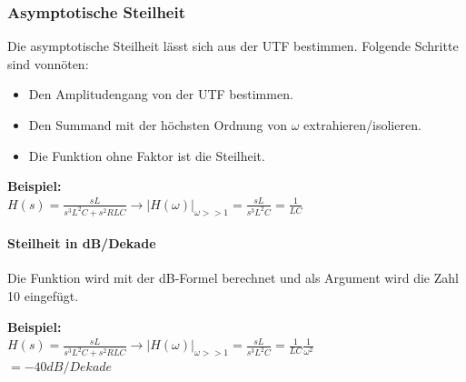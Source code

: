 		\subsubsection{Asymptotische Steilheit}
			\parbox{9cm}{
			Die asymptotische Steilheit lässt sich aus der UTF bestimmen. 
			Folgende Schritte sind vonnöten:
			\begin{itemize}
				\item Den Amplitudengang von der UTF bestimmen.
				\item Den Summand mit der höchsten Ordnung von $\omega$ extrahieren/isolieren.
				\item Die Funktion ohne Faktor ist die Steilheit.
			\end{itemize}
			}
			\parbox{1cm}{
				\quad
			}
			\parbox{9cm}{
				\textbf{Beispiel:} \\
				$H(s) = \frac{sL}{s^3L^2C + s^2RLC} \rightarrow |H(\omega)|_{\omega >> 1} = \frac{sL}{s^3L^2C} = \frac{1}{LC}$
			}
		
			\paragraph{Steilheit in dB/Dekade}
				\parbox{5cm}{
				}
				\parbox{4cm}{
					Die Funktion wird mit der dB-Formel berechnet und als Argument wird die Zahl 10 eingefügt. \\
				}
				\parbox{1cm}{
					\quad
				}
				\parbox{10cm}{
					\textbf{Beispiel:}	\\
					$H(s) = \frac{sL}{s^3L^2C + s^2RLC} \rightarrow |H(\omega)|_{\omega >> 1} = \frac{sL}{s^3L^2C} = \frac{1}{LC} \frac{1}{\omega^2}$	\\[5pt]
					 $= -40 dB/Dekade$
				}
		
